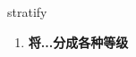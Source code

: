 
\begin{frame}
{\huge stratify}
\begin{center}
\begin{enumerate}\Large
  \item \textbf{将...分成各种等级}
\end{enumerate}
\end{center}
\end{frame}
